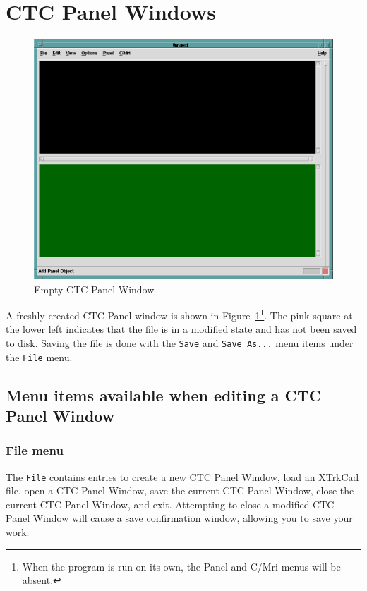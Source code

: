 \section{CTC Panel Windows}

\begin{figure}[hbpt]
\begin{centering}
\includegraphics[width=5in]{DISPEmptyCTCPanel.png}
\caption{Empty CTC Panel Window}
\label{fig:dispatcher:emptyCTCPanel}
\end{centering}
\end{figure}
A freshly created CTC Panel window is shown in
Figure~\ref{fig:dispatcher:emptyCTCPanel}\footnote{When the program is
run on its own, the Panel and C/Mri menus will be absent.}. The pink
square at the lower left indicates that the file is in a modified state
and has not been saved to disk.  Saving the file is done with the
\verb=Save= and \verb=Save As...= menu items under the \verb=File= menu.

\subsection{Menu items available when editing a CTC Panel Window}

\subsubsection{File menu}

The \verb=File= contains entries to create a new CTC Panel Window, load
an XTrkCad file, open a CTC Panel Window, save the current CTC Panel
Window, close the current CTC Panel Window, and exit.  Attempting to
close a modified CTC Panel Window will cause a save confirmation window,
allowing you to save your work.

